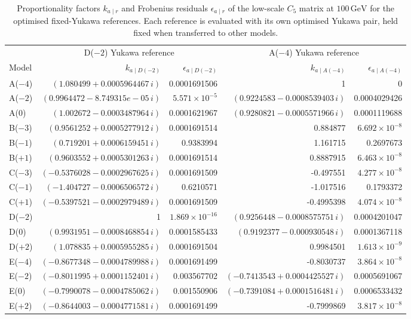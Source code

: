 \begin{table}[p]
\centering
\caption{Proportionality factors $k_{a\mid r}$ and Frobenius residuals $\epsilon_{a\mid r}$ of the low-scale $C_5$ matrix at $100\,\mathrm{GeV}$ for the optimised fixed-Yukawa references. Each reference is evaluated with its own optimised Yukawa pair, held fixed when transferred to other models.}
\label{tab:appC_dual_amplitude}
\begingroup\footnotesize
\setlength{\tabcolsep}{5pt}
\renewcommand{\arraystretch}{1.08}
\begin{tabular}{lrrrr}
\hline
 & \multicolumn{2}{c}{D($-2$) Yukawa reference} & \multicolumn{2}{c}{A($-4$) Yukawa reference} \\
Model & $k_{a\mid D(-2)}$ & $\epsilon_{a\mid D(-2)}$ & $k_{a\mid A(-4)}$ & $\epsilon_{a\mid A(-4)}$ \\
\hline
A($-4$) & $(1.080499+0.0005964467\,i)$ & 0.0001691506 & 1 & 0 \\
A($-2$) & $(0.9964472-8.749315e-05\,i)$ & $5.571\times10^{-5}$ & $(0.9224583-0.0008539403\,i)$ & 0.0004029426 \\
A($0$) & $(1.002672-0.0003487964\,i)$ & 0.0001621967 & $(0.9280821-0.0005571966\,i)$ & 0.0001119688 \\
B($-3$) & $(0.9561252+0.0005277912\,i)$ & 0.0001691514 & 0.884877 & $6.692\times10^{-8}$ \\
B($-1$) & $(0.719201+0.0006159451\,i)$ & 0.9383994 & 1.161715 & 0.2697673 \\
B($+1$) & $(0.9603552+0.0005301263\,i)$ & 0.0001691514 & 0.8887915 & $6.463\times10^{-8}$ \\
C($-3$) & $(-0.5376028-0.0002967625\,i)$ & 0.0001691509 & -0.497551 & $4.277\times10^{-8}$ \\
C($-1$) & $(-1.404727-0.0006506572\,i)$ & 0.6210571 & -1.017516 & 0.1793372 \\
C($+1$) & $(-0.5397521-0.0002979489\,i)$ & 0.0001691509 & -0.4995398 & $4.074\times10^{-8}$ \\
D($-2$) & 1 & $1.869\times10^{-16}$ & $(0.9256448-0.0008575751\,i)$ & 0.0004201047 \\
D($0$) & $(0.9931951-0.0008468854\,i)$ & 0.0001585433 & $(0.9192377-0.000930548\,i)$ & 0.0001367118 \\
D($+2$) & $(1.078835+0.0005955285\,i)$ & 0.0001691504 & 0.9984501 & $1.613\times10^{-9}$ \\
E($-4$) & $(-0.8677348-0.0004789988\,i)$ & 0.0001691499 & -0.8030737 & $3.864\times10^{-8}$ \\
E($-2$) & $(-0.8011995+0.0001152401\,i)$ & 0.003567702 & $(-0.7413543+0.0004425527\,i)$ & 0.0005691067 \\
E($0$) & $(-0.7990078-0.0004785062\,i)$ & 0.001550906 & $(-0.7391084+0.0001516481\,i)$ & 0.0006533432 \\
E($+2$) & $(-0.8644003-0.0004771581\,i)$ & 0.0001691499 & -0.7999869 & $3.817\times10^{-8}$ \\
\hline
\end{tabular}
\endgroup
\end{table}
